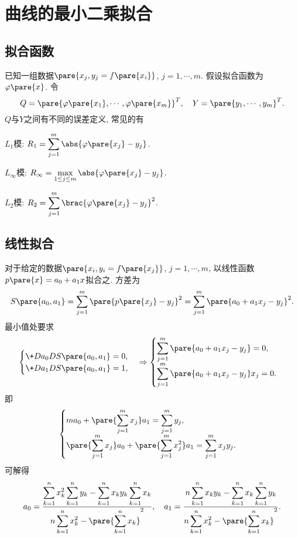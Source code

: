 \documentclass[hidelinks]{ctexart}
\begin{document}
\section{曲线的最小二乘拟合} %
\label{sec:曲线的最小二乘拟合}

\subsection{拟合函数} %
\label{sub:拟合函数}

已知一组数据$\pare{x_j, y_j = f\pare{x_i}}$, $j = 1,\cdots,m$. 假设拟合函数为$\varphi\pare{x}$. 令
\[ Q = \pare{\varphi\pare{x_1},\cdots,\varphi\pare{x_m}}^T,\quad Y = \pare{y_1,\cdots,y_m}^T. \]
$Q$与$Y$之间有不同的误差定义, 常见的有
\begin{cenum}
    \item $L_1$模: $\displaystyle R_1 = \sum_{j=1}^m \abs{\varphi\pare{x_j} - y_j}$.
    \item $L_\infty$模: $\displaystyle R_\infty = \max_{1\le j\le m} \abs{\varphi\pare{x_j} - y_j}$.
    \item $L_2$模: $\displaystyle R_2 = \sum_{j=1}^m \brac{\varphi\pare{x_j} - y_j}^2$.
\end{cenum}


\subsection{线性拟合} %
\label{sub:线性拟合}

对于给定的数据$\pare{x_i,y_i=f\pare{x_j}}$, $j=1,\cdots,m$, 以线性函数$p\pare{x} = a_0 + a_1 x$拟合之. 方差为
\[ S\pare{a_0,a_1} = \sum_{j=1}^m \pare{p\pare{x_j} - y_j}^2 = \sum_{j=1}^m \pare{a_0+a_1 x_j - y_j}^2. \]
最小值处要求
\[ \begin{cases}
    \displaystyle \+D{a_0}D{S\pare{a_0,a_1}} = 0, \\
    \displaystyle \+D{a_1}D{S\pare{a_0,a_1}} = 1,
\end{cases} \Rightarrow \begin{cases}
    \displaystyle \sum_{j=1}^m \pare{a_0 + a_1 x_j - y_j} = 0, \\
    \displaystyle \sum_{j=1}^m  \pare{a_0 + a_1 x_j - y_j}x_j = 0.
\end{cases} \]
即
\[ \begin{cases}
    \displaystyle ma_0 + \pare{\sum_{j=1}^m x_j} a_1 = \sum_{j=1}^m y_j, \\
    \displaystyle \pare{\sum_{j=1}^m x_j}a_0 + \pare{\sum_{j=1}^m x_j^2}a_1 = \sum_{j=1}^m x_jy_j.
\end{cases} \]
可解得
\[ a_0 = \frac{\displaystyle \sum_{k=1}^n x_k^2 \sum_{k=1}^n y_k - \sum_{k=1}^n x_ky_k \sum_{k=1}^n x_k}{\displaystyle n\sum_{k=1}^n x_k^2 - \pare{\sum_{k=1}^n x_k}^2},\quad a_1 = \frac{\displaystyle n\sum_{k=1}^n x_ky_k - \sum_{k=1}^n x_k \sum_{k=1}^n y_k}{\displaystyle n\sum_{k=1}^n x_k^2 - \pare{\sum_{k=1}^n x_k}^2}. \]
\end{document}
